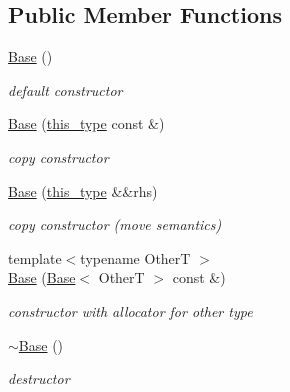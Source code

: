 \subsection*{Public Member Functions}
\begin{DoxyCompactItemize}
\item 
\hypertarget{classhryky_1_1allocator_1_1_base_a1823634e5b3af6182517befa6a4f8a41}{\hyperlink{classhryky_1_1allocator_1_1_base_a1823634e5b3af6182517befa6a4f8a41}{Base} ()}\label{classhryky_1_1allocator_1_1_base_a1823634e5b3af6182517befa6a4f8a41}

\begin{DoxyCompactList}\small\item\em default constructor \end{DoxyCompactList}\item 
\hypertarget{classhryky_1_1allocator_1_1_base_a286aff80c28a5fff8879c8dd60a13fa0}{\hyperlink{classhryky_1_1allocator_1_1_base_a286aff80c28a5fff8879c8dd60a13fa0}{Base} (\hyperlink{classhryky_1_1allocator_1_1_base}{this\-\_\-type} const \&)}\label{classhryky_1_1allocator_1_1_base_a286aff80c28a5fff8879c8dd60a13fa0}

\begin{DoxyCompactList}\small\item\em copy constructor \end{DoxyCompactList}\item 
\hypertarget{classhryky_1_1allocator_1_1_base_af34929ffe25b77cd087a678b43e5dd44}{\hyperlink{classhryky_1_1allocator_1_1_base_af34929ffe25b77cd087a678b43e5dd44}{Base} (\hyperlink{classhryky_1_1allocator_1_1_base}{this\-\_\-type} \&\&rhs)}\label{classhryky_1_1allocator_1_1_base_af34929ffe25b77cd087a678b43e5dd44}

\begin{DoxyCompactList}\small\item\em copy constructor (move semantics) \end{DoxyCompactList}\item 
\hypertarget{classhryky_1_1allocator_1_1_base_a210f34c1c05082586f727cc25fec5d00}{{\footnotesize template$<$typename Other\-T $>$ }\\\hyperlink{classhryky_1_1allocator_1_1_base_a210f34c1c05082586f727cc25fec5d00}{Base} (\hyperlink{classhryky_1_1allocator_1_1_base}{Base}$<$ Other\-T $>$ const \&)}\label{classhryky_1_1allocator_1_1_base_a210f34c1c05082586f727cc25fec5d00}

\begin{DoxyCompactList}\small\item\em constructor with allocator for other type \end{DoxyCompactList}\item 
\hypertarget{classhryky_1_1allocator_1_1_base_ae323e547fa7887864709a70d706cab8c}{\hyperlink{classhryky_1_1allocator_1_1_base_ae323e547fa7887864709a70d706cab8c}{$\sim$\-Base} ()}\label{classhryky_1_1allocator_1_1_base_ae323e547fa7887864709a70d706cab8c}

\begin{DoxyCompactList}\small\item\em destructor \end{DoxyCompactList}\end{DoxyCompactItemize}


